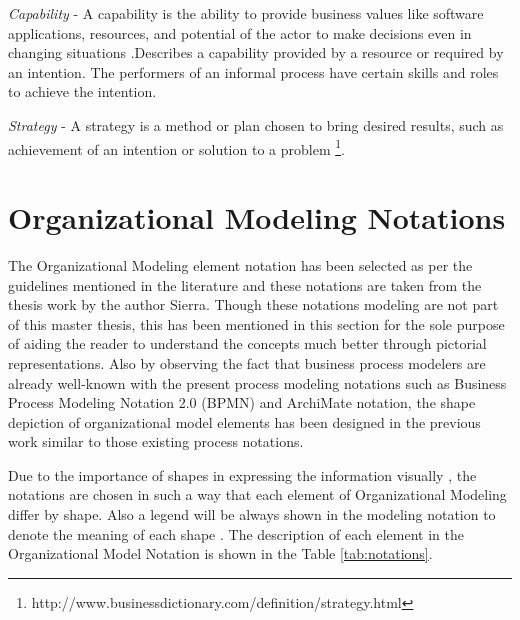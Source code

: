 \textit{Capability} - A capability is the ability to provide business values like software applications, resources, and potential of the actor to make decisions even in changing situations \cite{Stirna2012}.Describes a capability provided by a resource or required by an intention. The performers of an informal process have certain skills and roles to achieve the intention.   

\textit{Strategy} -  A  strategy is a method or plan chosen to bring  desired results, such as achievement of an intention or solution to a problem \footnote{http://www.businessdictionary.com/definition/strategy.html}. 

\section{Organizational Modeling Notations}
\label{sec:resourcecentricorganizationalmodeling}
The Organizational Modeling element notation has been selected as per the guidelines mentioned in the literature \cite{Moody2009} and these notations are taken from the thesis work by the author Sierra\cite{Sierr2015}. Though these notations modeling are not part of this master thesis, this has been mentioned in this section for the sole purpose of aiding the reader to understand the concepts much better through pictorial representations. Also by observing  the fact that business process modelers are already well-known with the present process modeling notations such as Business Process Modeling Notation 2.0 (BPMN) \cite{bpm2011} and ArchiMate notation\cite{arc2013}, the shape depiction of organizational model elements has been designed in the previous work \cite{Sierr2015} similar to those existing process notations. 

Due to the importance of shapes in expressing the information visually , the notations are chosen in such a way that each element of Organizational Modeling  differ by shape. Also a legend will be always shown in the modeling notation to denote the meaning of each shape \cite{Moody2009}. The description of each element in the Organizational Model Notation is shown in the Table \ref{tab:notations}. 

